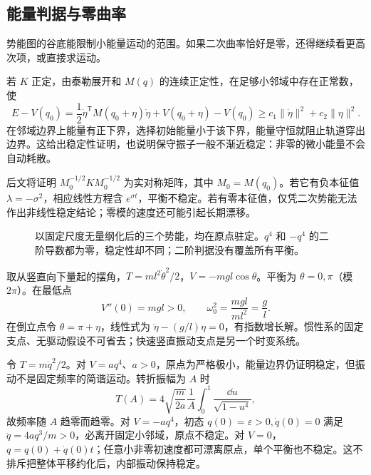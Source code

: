 \subsection{能量判据与零曲率}
势能图的谷底能限制小能量运动的范围。如果二次曲率恰好是零，还得继续看更高次项，或直接求运动。

若 $K$ 正定，由泰勒展开和 $M(q)$ 的连续正定性，在足够小邻域中存在正常数，使
\[
E-V(q_0)=\frac12\dot\eta^{\mathsf T}M(q_0+\eta)\dot\eta
+V(q_0+\eta)-V(q_0)
\ge c_1\|\dot\eta\|^2+c_2\|\eta\|^2.
\]
在邻域边界上能量有正下界，选择初始能量小于该下界，能量守恒就阻止轨道穿出边界。这给出稳定性证明，也说明保守振子一般不渐近稳定：非零的微小能量不会自动耗散。

后文将证明 $M_0^{-1/2}KM_0^{-1/2}$ 为实对称矩阵，其中 $M_0=M(q_0)$。若它有负本征值 $\lambda=-\sigma^2$，相应线性方程含 $e^{\sigma t}$，平衡不稳定。若有零本征值，仅凭二次势能无法作出非线性稳定结论；零模的速度还可能引起长期漂移。

\begin{figure}[htbp]
\centering
{}
\caption{以固定尺度无量纲化后的三个势能，均在原点驻定。$q^4$ 和 $-q^4$ 的二阶导数都为零，稳定性却不同；二阶判据没有覆盖所有平衡。}
\label{fig:potential-stability}
\end{figure}

\begin{example}[单摆：稳定点与倒立点]
取从竖直向下量起的摆角，$T=ml^2\dot\theta^2/2$，$V=-mgl\cos\theta$。平衡为 $\theta=0,\pi$（模 $2\pi$）。在最低点
\[
V''(0)=mgl>0,\qquad \omega_0^2=\frac{mgl}{ml^2}=\frac gl.
\]
在倒立点令 $\theta=\pi+\eta$，线性式为 $\ddot\eta-(g/l)\eta=0$，有指数增长解。惯性系的固定支点、无驱动假设不可省去；快速竖直振动支点是另一个时变系统。
\end{example}

\begin{example}
令 $T=m\dot q^2/2$。对 $V=aq^4$、$a>0$，原点为严格极小，能量边界仍证明稳定，但振动不是固定频率的简谐运动。转折振幅为 $A$ 时
\[
T(A)=4\sqrt{\frac{m}{2a}}\frac1A
\int_0^1\frac{\dd u}{\sqrt{1-u^4}},
\]
故频率随 $A$ 趋零而趋零。对 $V=-aq^4$，初态 $q(0)=\varepsilon>0,\dot q(0)=0$ 满足 $\ddot q=4aq^3/m>0$，必离开固定小邻域，原点不稳定。对 $V=0$，$q=q(0)+\dot q(0)t$；任意小非零初速度都可漂离原点，单个平衡也不稳定。这不排斥把整体平移约化后，内部振动保持稳定。
\end{example}

